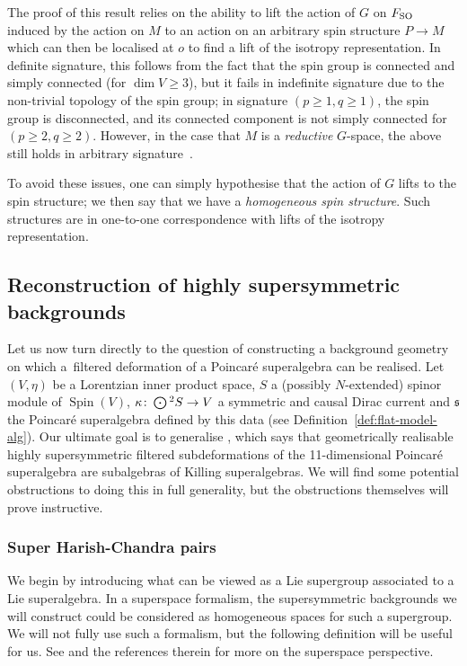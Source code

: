 \documentclass[10pt,a4paper]{amsart}
\numberwithin{equation}{section}
\newcommand{\fs}{\mathfrak{s}}
\newcommand{\Odot}{\mathchoice{{\textstyle\bigodot}}{\bigodot}{\bigodot}{\bigodot}}
\newcommand{\1}{\mathbbm{1}}
\DeclareMathOperator{\Spin}{Spin}
\begin{document}
The proof of this result relies on the ability to lift the action of $G$ on $F_{\rm SO}$ induced by the action on $M$ to an action on an arbitrary spin structure $P\to M$ which can then be localised at $o$ to find a lift of the isotropy representation. In definite signature, this follows from the fact that the spin group is connected and simply connected (for $\dim V \geq 3$), but it fails in indefinite signature due to the non-trivial topology of the spin group; in signature $(p\geq 1,q\geq 1)$, the spin group is disconnected, and its connected component is not simply connected for $(p\geq 2,q\geq 2)$. However, in the case that $M$ is a \emph{reductive} $G$-space, the above still holds in arbitrary signature~\cite{Alekseevsky2019,Cahen1993}.

To avoid these issues, one can simply hypothesise that the action of $G$ lifts to the spin structure; we then say that we have a \emph{homogeneous spin structure}. Such structures are in one-to-one correspondence with lifts of the isotropy representation.

\subsection{Reconstruction of highly supersymmetric backgrounds}
\label{sec:high-susy-spin-mfld-homogeneous}

Let us now turn directly to the question of constructing a background geometry on which a~filtered deformation of a Poincar\'e superalgebra can be realised. Let $(V,\eta)$ be a Lorentzian inner product space, $S$ a (possibly $N$-extended) spinor module of $\Spin(V)$, $\kappa\colon \Odot^2 S\to V$ a symmetric and causal Dirac current and $\fs$ the Poincar\'e superalgebra defined by this data (see Definition~\ref{def:flat-model-alg}). Our ultimate goal is to generalise \cite[Theorem~13]{Figueroa-OFarrill2017_1}, which says that geometrically realisable highly supersymmetric filtered subdeformations of the 11-dimensional Poincar\'e superalgebra are subalgebras of Killing superalgebras. We will find some potential obstructions to doing this in full generality, but the obstructions themselves will prove instructive.

\subsubsection{Super Harish-Chandra pairs}

We begin by introducing what can be viewed as a Lie supergroup associated to a Lie superalgebra. In a superspace formalism, the supersymmetric backgrounds we will construct could be considered as homogeneous spaces for such a supergroup. We will not fully use such a formalism, but the following definition will be useful for us. See \cite{Santi2010} and the references therein for more on the superspace perspective.
\end{document}
